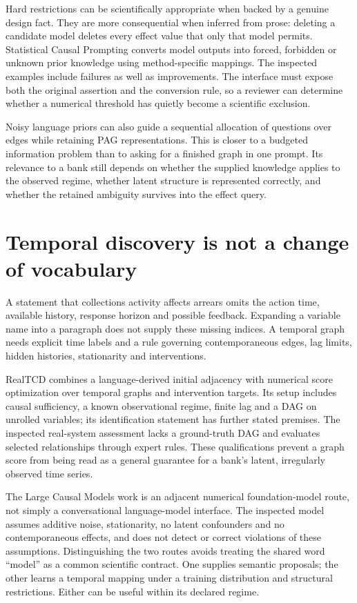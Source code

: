 Hard restrictions can be scientifically appropriate when backed by a genuine
design fact. They are more consequential when inferred from prose: deleting a
candidate model deletes every effect value that only that model permits.
Statistical Causal Prompting converts model outputs into forced, forbidden or
unknown prior knowledge using method-specific mappings. The inspected examples
include failures as well as improvements. \citep{v12_la_2402_01454} The interface
must expose both the original assertion and the conversion rule, so a reviewer
can determine whether a numerical threshold has quietly become a scientific
exclusion.

Noisy language priors can also guide a sequential allocation of questions over
edges while retaining PAG representations. \citep{v12_la_2506_16234} This is closer
to a budgeted information problem than to asking for a finished graph in one
prompt. Its relevance to a bank still depends on whether the supplied knowledge
applies to the observed regime, whether latent structure is represented
correctly, and whether the retained ambiguity survives into the effect query.

\section{Temporal discovery is not a change of vocabulary}

A statement that collections activity affects arrears omits the action time,
available history, response horizon and possible feedback. Expanding a variable
name into a paragraph does not supply these missing indices. A temporal graph
needs explicit time labels and a rule governing contemporaneous edges, lag
limits, hidden histories, stationarity and interventions.

RealTCD combines a language-derived initial adjacency with numerical score
optimization over temporal graphs and intervention targets. Its setup includes
causal sufficiency, a known observational regime, finite lag and a DAG on
unrolled variables; its identification statement has further stated premises.
The inspected real-system assessment lacks a ground-truth DAG and evaluates
selected relationships through expert rules. \citep{v12_la_2404_14786} These
qualifications prevent a graph score from being read as a general guarantee
for a bank's latent, irregularly observed time series.

The Large Causal Models work is an adjacent numerical foundation-model route,
not simply a conversational language-model interface. The inspected model
assumes additive noise, stationarity, no latent confounders and no
contemporaneous effects, and does not detect or correct violations of these
assumptions. \citep{v12_la_2602_18662} Distinguishing the two routes avoids treating
the shared word ``model'' as a common scientific contract. One supplies semantic
proposals; the other learns a temporal mapping under a training distribution
and structural restrictions. Either can be useful within its declared regime.

